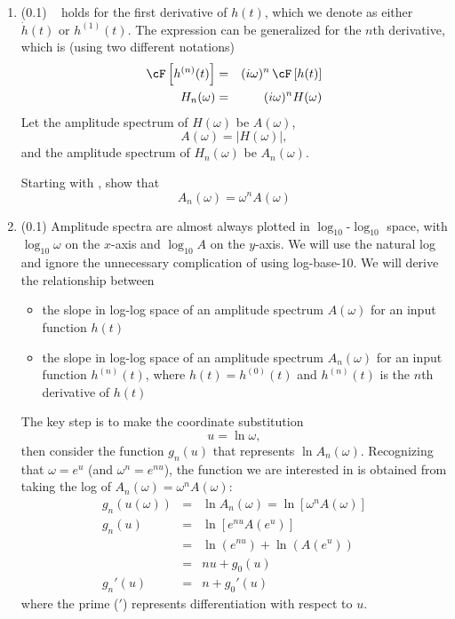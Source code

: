 \documentclass[11pt,titlepage,fleqn]{article}
\newcommand{\fft}{h}
\newcommand{\ffw}{H}
\begin{document}
\begin{enumerate}

\item (0.1) \ptag\  holds for the first derivative of $\fft(t)$, which we denote as either $\dot{\fft}(t)$ or $\fft^{(1)}(t)$. The expression can be generalized for the $n$th derivative, which is (using two different notations)
%
\begin{eqnarray}
\cF \left[ \fft^{(n)}(t) \right] &=& (i\omega)^n \, \cF \left[ \fft(t) \right]
\\
\ffw_n(\omega) &=& (i\omega)^n \ffw(\omega)
\label{fftnder}
\end{eqnarray}
%
Let the amplitude spectrum of $\ffw(\omega)$ be $A(\omega)$,
%
\begin{equation}
A(\omega) = |\ffw(\omega)|,
\end{equation}
%
and the amplitude spectrum of $\ffw_n(\omega)$ be $A_n(\omega)$.

Starting with , show that
%
\begin{equation}
A_n(\omega) = \omega^n A(\omega)
\end{equation}


\item (0.1) \ptag Amplitude spectra are almost always plotted in $\log_{10}$-$\log_{10}$ space, with $\log_{10}\omega$ on the $x$-axis and $\log_{10}A$ on the $y$-axis. We will use the natural log and ignore the unnecessary complication of using log-base-10. We will derive the relationship between
%
\begin{itemize}
\item the slope in log-log space of an amplitude spectrum $A(\omega)$ for an input function $\fft(t)$
\item the slope in log-log space of an amplitude spectrum $A_n(\omega)$ for an input function $h^{(n)}(t)$, where $h(t) = h^{(0)}(t)$ and $h^{(n)}(t)$ is the $n$th derivative of $h(t)$
\end{itemize}

The key step is to make the coordinate substitution
%
\begin{equation}
u = \ln\omega,
\end{equation}
%
then consider the function $g_n(u)$ that represents $\ln A_n(\omega)$. Recognizing that $\omega = e^u$ (and $\omega^n = e^{nu}$), the function we are interested in is obtained from taking the log of \mbox{$A_n(\omega) = \omega^n A(\omega)$}:
%
\begin{eqnarray}
g_n(u(\omega)) &=& \ln A_n(\omega) = \ln[ \omega^n A(\omega)]
\\
g_n(u) &=& \ln[ e^{nu} A(e^u) ]
\\
&=& \ln(e^{nu}) + \ln(A(e^u))
\\
&=& nu + g_0(u)
\\
g_n'(u) &=& n + g_0'(u)
\label{Anslope}
\end{eqnarray}
%
where the prime ($'$) represents differentiation with respect to $u$.


\end{enumerate}
\end{document}
